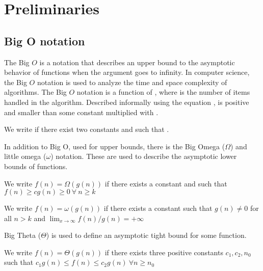 \section{Preliminaries}

\subsection{Big O notation}

 The Big $O$ is a notation that describes an upper bound to the asymptotic behavior of functions when the argument goes to infinity. In computer science, the Big $O$ notation is used to analyze the time and space complexity of algorithms. The Big $O$ notation is a function of , where  is the number of items handled in the algorithm. Described informally using the equation ,  is positive and smaller than some constant multiplied with .
 
 \begin{definition}
 We write  if there exist two constants
  and  such that .
 \end{definition}

In addition to Big O, used for upper bounds, there is the Big Omega ($\Omega$) and little omega ($\omega$) notation. These are used to describe the asymptotic lower bounds of functions. 

 \begin{definition}
 We write $f(n) = \Omega(g(n))$ if there exists a constant
  and  such that $f(n) \geq cg(n) \geq 0 \: \forall \: n \geq k$
 \end{definition}

 \begin{definition}
We write $f(n) = \omega(g(n))$ if there exists a constant
   such that $g(n) \neq 0$ for all $n > k$ and $ \lim_{x \to \infty} f(n) / g(n) = + \infty$
 \end{definition}

Big Theta ($\Theta$) is used to define an asymptotic tight bound for some function. 

 \begin{definition}
    We write $f(n) = \Theta(g(n))$ if there exists three positive constants $c_1, c_2, n_0$ such that $c_1 g(n) \leq f(n) \leq c_2 g(n) \ \forall n \geq n_0$
 \end{definition}



